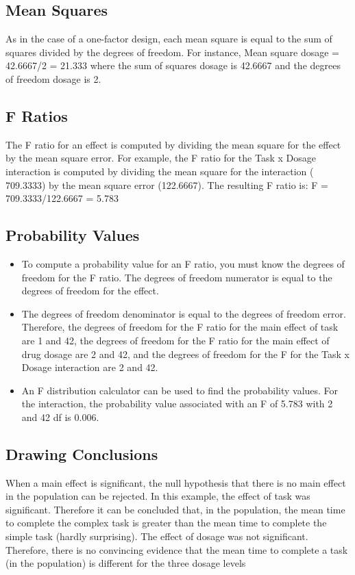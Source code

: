 \documentclass[a4paper,12pt]{article}
\begin{document}
\subsection{Mean Squares}
As in the case of a one-factor design, each mean square is equal to the sum of squares divided by the degrees of freedom. For instance, Mean square dosage = 42.6667/2 = 21.333 where the sum of squares dosage is 42.6667 and the degrees of freedom dosage is 2.


\subsection{F Ratios}
The F ratio for an effect is computed by dividing the mean square for the effect by the mean square error. For example, the F ratio for the Task x Dosage interaction is computed by dividing the mean square for the interaction ( 709.3333) by the mean square error (122.6667). The resulting F ratio is: F = 709.3333/122.6667 = 5.783


\subsection{Probability Values}
\begin{itemize}
    \item To compute a probability value for an F ratio, you must know the degrees of freedom for the F ratio. The degrees of freedom numerator is equal to the degrees of freedom for the effect. 
    \item The degrees of freedom denominator is equal to the degrees of freedom error. Therefore, the degrees of freedom for the F ratio for the main effect of task are 1 and 42, the degrees of freedom for the F ratio for the main effect of drug dosage are 2 and 42, and the degrees of freedom for the F for the Task x Dosage interaction are 2 and 42.

\item An F distribution calculator can be used to find the probability values. For the interaction, the probability value associated with an F of 5.783 with 2 and 42 df is 0.006.
\end{itemize}


\subsection{Drawing Conclusions}

When a main effect is significant, the null hypothesis that there is no main effect in the population can be rejected. In this example, the effect of task was significant. Therefore it can be concluded that, in the population, the mean time to complete the complex task is greater than the mean time to complete the simple task (hardly surprising). The effect of dosage was not significant. Therefore, there is no convincing evidence that the mean time to complete a task (in the population) is different for the three dosage levels
\end{document}
